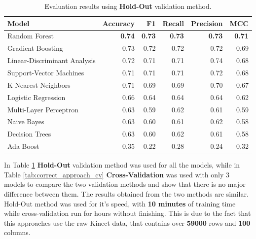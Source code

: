                 \begin{table}[htbp]
                    \centering
                    \caption{Evaluation results using \textbf{Hold-Out} validation method.}
                    \label{tab:correct_approach_holdout}
                    \begin{tabular}{lrrrrr}
                        \toprule
                        \textbf{Model} & \textbf{Accuracy} & \textbf{F1} & \textbf{Recall} & \textbf{Precision} & \textbf{MCC} \\
                        \midrule
                        Random Forest & \textbf{0.74} & \textbf{0.73} & \textbf{0.73} & \textbf{0.73} & \textbf{0.71} \\
                        Gradient Boosting & 0.73 & 0.72 & 0.72 & 0.72 & 0.69 \\
                        Linear-Discriminant Analysis & 0.72 & 0.71 & 0.71 & 0.74 & 0.68 \\
                        Support-Vector Machines & 0.71 & 0.71 & 0.71 & 0.72 & 0.68 \\
                        K-Nearest Neighbors & 0.71 & 0.69 & 0.69 & 0.70 & 0.67 \\
                        Logistic Regression & 0.66 & 0.64 & 0.64 & 0.64 & 0.62 \\
                        Multi-Layer Perceptron & 0.63 & 0.59 & 0.62 & 0.61 & 0.59 \\
                        Naive Bayes & 0.63 & 0.60 & 0.61 & 0.62 & 0.58 \\
                        Decision Trees & 0.63 & 0.60 & 0.62 & 0.61 & 0.58 \\
                        Ada Boost & 0.35 & 0.22 & 0.28 & 0.24 & 0.32 \\
                        \bottomrule
                    \end{tabular}
                \end{table}

                In Table \ref{tab:correct_approach_holdout} \textbf{Hold-Out} validation method was used for all the models, while in Table \ref{tab:correct_approach_cv} \textbf{Cross-Validation} was used with only 3 models to compare the two validation methods and show that there is no major difference between them. The results obtained from the two methods are similar. \\

                Hold-Out method was used for it's speed, with \textbf{10 minutes} of training time while cross-validation run for hours without finishing. This is due to the fact that this approaches use the raw Kinect data, that contains over \textbf{59000} rows and \textbf{100} columns. 
                
